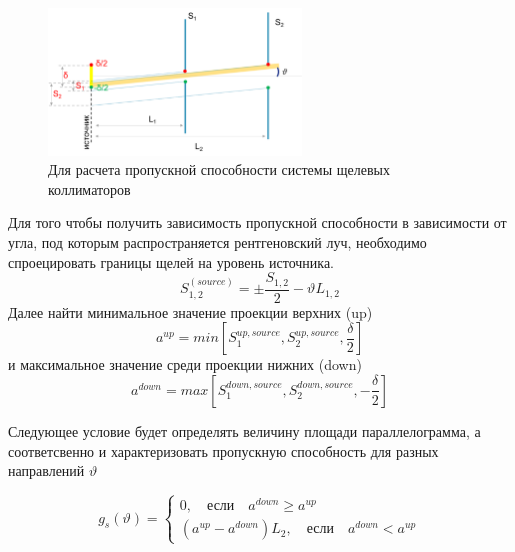 \newpage
  \begin{center}
  \section{ }%
  \label{sec:calc_slits_ability}
  \end{center}


\begin{figure}[H]
  \centering
  \includegraphics[width=0.6\textwidth]{images/calc_slits_ability.png}
  \caption{Для расчета пропускной способности системы щелевых коллиматоров}
  \label{ris:calc_slits_ability}
\end{figure}

Для того чтобы получить зависимость пропускной способности в зависимости от угла,
под которым распространяется рентгеновский луч, необходимо спроецировать границы
щелей на уровень источника.
$$ S^{(source)}_{1,2} = \pm \frac{S_{1,2}}{2} - \vartheta L_{1,2}$$
 Далее найти минимальное значение проекции верхних (up)
 $$ a^{up} = min [S_1^{up,source},S_2^{up,source},\frac{\delta}{2}]$$
и максимальное значение среди проекции нижних (down)
$$ a^{down} = max [S_1^{down,source},S_2^{down,source},-\frac{\delta}{2}]$$

Следующее условие будет определять величину площади параллелограмма, а соответсвенно
и характеризовать пропускную способность для разных направлений $\vartheta$

\begin{equation}
  g_s(\vartheta) =
 \begin{cases}
   0, \quad \text{если} \quad a^{down} \geq a^{up}
   \\
    (a^{up} - a^{down})L_2,\quad \text{если} \quad a^{down} < a^{up}
 \end{cases}
\end{equation}
